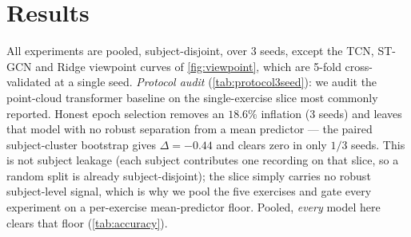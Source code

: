 \documentclass[10pt,twocolumn,letterpaper]{article}
\begin{document}
\section{Results}\label{sec:results}
All experiments are pooled, subject-disjoint, over 3 seeds, except the TCN, ST-GCN and Ridge
viewpoint curves of \cref{fig:viewpoint}, which are 5-fold cross-validated at a single seed.
\emph{Protocol audit}
(\cref{tab:protocol3seed}): we audit the point-cloud transformer baseline on the single-exercise slice
most commonly reported. Honest epoch selection removes an $18.6\%$ inflation (3 seeds) and leaves that
model with no robust separation from a mean predictor --- the paired subject-cluster bootstrap gives
$\Delta=-0.44$ and clears zero in only $1/3$ seeds. This is not
subject leakage (each subject contributes one recording on that slice, so a random split is already
subject-disjoint); the slice simply carries no robust subject-level signal, which is why we pool the
five exercises and gate every experiment on a per-exercise mean-predictor floor. Pooled, \emph{every}
model here clears that floor (\cref{tab:accuracy}).

\begin{table}[t]\centering\small
\setlength{\tabcolsep}{5pt}
\caption{Protocol audit of the \emph{point-cloud transformer baseline}, single-exercise slice (KIMORE
Ex.~1; subject-disjoint 5-fold; 3 seeds). \emph{Honest} selects the epoch on a held-out validation fold;
\emph{inflated} takes the per-epoch test minimum (the reference protocol). $\Delta$ is the paired
subject-cluster bootstrap $\text{MAD}(\text{honest})-\text{MAD}(\text{floor})$; an interval below $0$
means the model beats the mean predictor. The signal here is \emph{seed-fragile}, clearing zero in only
$1/3$ seeds; pooling fixes this, for this model and every other (\cref{tab:accuracy}).}
\label{tab:protocol3seed}
\end{table}
\end{document}

